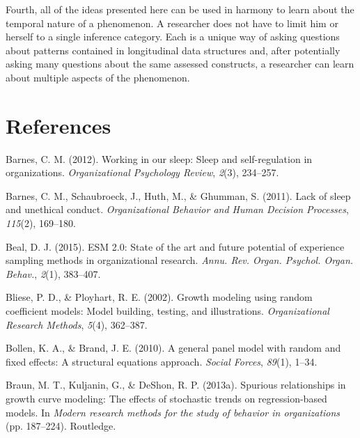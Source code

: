 \documentclass[english,,man]{apa6}
\theoremstyle{definition}
\theoremstyle{definition}
\theoremstyle{definition}
\theoremstyle{remark}
\begin{document}
Fourth, all of the ideas presented here can be used in harmony to learn
about the temporal nature of a phenomenon. A researcher does not have to
limit him or herself to a single inference category. Each is a unique
way of asking questions about patterns contained in longitudinal data
structures and, after potentially asking many questions about the same
assessed constructs, a researcher can learn about multiple aspects of
the phenomenon.

\newpage

\hypertarget{references}{%
\section{References}\label{references}}

\setlength{\parindent}{-0.5in}
\setlength{\leftskip}{0.5in}

\hypertarget{refs}{}
\leavevmode\hypertarget{ref-barnes2012working}{}%
Barnes, C. M. (2012). Working in our sleep: Sleep and self-regulation in
organizations. \emph{Organizational Psychology Review}, \emph{2}(3),
234--257.

\leavevmode\hypertarget{ref-barnes_lack_2011}{}%
Barnes, C. M., Schaubroeck, J., Huth, M., \& Ghumman, S. (2011). Lack of
sleep and unethical conduct. \emph{Organizational Behavior and Human
Decision Processes}, \emph{115}(2), 169--180.

\leavevmode\hypertarget{ref-beal_esm_2015}{}%
Beal, D. J. (2015). ESM 2.0: State of the art and future potential of
experience sampling methods in organizational research. \emph{Annu. Rev.
Organ. Psychol. Organ. Behav.}, \emph{2}(1), 383--407.

\leavevmode\hypertarget{ref-bliese_growth_2002}{}%
Bliese, P. D., \& Ployhart, R. E. (2002). Growth modeling using random
coefficient models: Model building, testing, and illustrations.
\emph{Organizational Research Methods}, \emph{5}(4), 362--387.

\leavevmode\hypertarget{ref-bollen_general_2010}{}%
Bollen, K. A., \& Brand, J. E. (2010). A general panel model with random
and fixed effects: A structural equations approach. \emph{Social
Forces}, \emph{89}(1), 1--34.

\leavevmode\hypertarget{ref-braun2013spurious}{}%
Braun, M. T., Kuljanin, G., \& DeShon, R. P. (2013a). Spurious
relationships in growth curve modeling: The effects of stochastic trends
on regression-based models. In \emph{Modern research methods for the
study of behavior in organizations} (pp. 187--224). Routledge.
\end{document}
